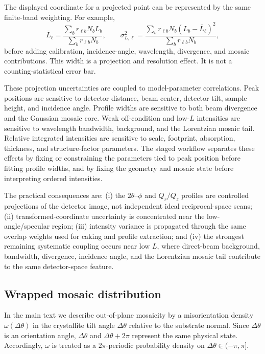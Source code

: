 \documentclass[11pt]{article}
\begin{document}
The displayed coordinate for a projected point can be represented by the same finite-band weighting. For example,
\begin{equation}
\bar L_{\ell}=\frac{\sum_b r_{\ell b}N_bL_b}{\sum_b r_{\ell b}N_b},
\qquad
\sigma^2_{L,\ell}=\frac{\sum_b r_{\ell b}N_b(L_b-\bar L_{\ell})^2}{\sum_b r_{\ell b}N_b},
\end{equation}
before adding calibration, incidence-angle, wavelength, divergence, and mosaic contributions. This width is a projection and resolution effect. It is not a counting-statistical error bar.

These projection uncertainties are coupled to model-parameter correlations. Peak positions are sensitive to detector distance, beam center, detector tilt, sample height, and incidence angle. Profile widths are sensitive to both beam divergence and the Gaussian mosaic core. Weak off-condition and low-$L$ intensities are sensitive to wavelength bandwidth, background, and the Lorentzian mosaic tail. Relative integrated intensities are sensitive to scale, footprint, absorption, thickness, and structure-factor parameters. The staged workflow separates these effects by fixing or constraining the parameters tied to peak position before fitting profile widths, and by fixing the geometry and mosaic state before interpreting ordered intensities.

The practical consequences are: (i) the $2\theta$--$\phi$ and $Q_r/Q_z$ profiles are controlled projections of the detector image, not independent ideal reciprocal-space scans; (ii) transformed-coordinate uncertainty is concentrated near the low-angle/specular region; (iii) intensity variance is propagated through the same overlap weights used for caking and profile extraction; and (iv) the strongest remaining systematic coupling occurs near low $L$, where direct-beam background, bandwidth, divergence, incidence angle, and the Lorentzian mosaic tail contribute to the same detector-space feature.

\subsection{Wrapped mosaic distribution}
\label{subsec:si_wrapped_mosaic}

In the main text we describe out-of-plane mosaicity by a misorientation density $\omega(\Delta\theta)$ in the crystallite tilt angle $\Delta\theta$ relative to the substrate normal. Since $\Delta\theta$ is an orientation angle, $\Delta\theta$ and $\Delta\theta+2\pi$ represent the same physical state. Accordingly, $\omega$ is treated as a $2\pi$-periodic probability density on $\Delta\theta\in(-\pi,\pi]$.
\end{document}
